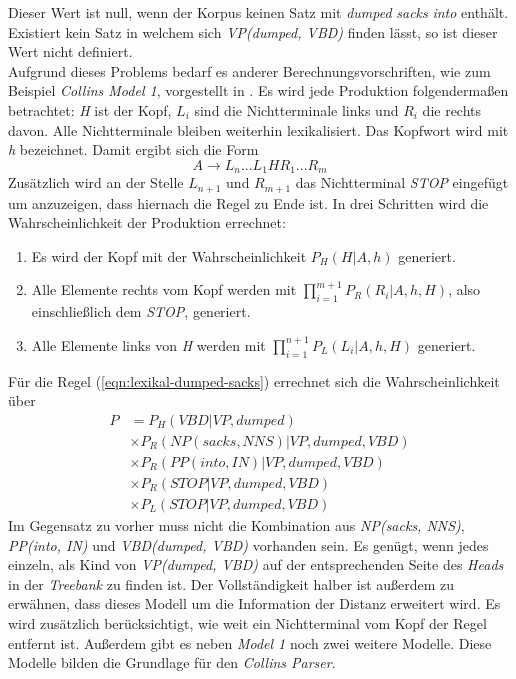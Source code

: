 Dieser Wert ist null, wenn der Korpus keinen Satz mit \textit{dumped} \textit{sacks} \textit{into} enthält. Existiert kein Satz in welchem sich \textit{VP(dumped, VBD)} finden lässt, so ist dieser Wert nicht definiert. \\
Aufgrund dieses Problems bedarf es anderer Berechnungsvorschriften, wie zum Beispiel \textit{Collins Model 1}, vorgestellt in \cite{collinsModel}. 
Es wird jede Produktion folgendermaßen betrachtet: \textit{H} ist der Kopf, \( L_i \) sind die Nichtterminale links und \( R_i \) die rechts davon. Alle Nichtterminale bleiben weiterhin lexikalisiert. Das Kopfwort wird mit \textit{h} bezeichnet. Damit ergibt sich die Form
\[ A \to L_n...L_1 H R_1...R_m \]
Zusätzlich wird an der Stelle \( L_{n+1} \) und \( R_{m+1} \) das Nichtterminal \textit{STOP} eingefügt um anzuzeigen, dass hiernach die Regel zu Ende ist. In drei Schritten wird die Wahrscheinlichkeit der Produktion errechnet:
\begin{enumerate}
\item Es wird der Kopf mit der Wahrscheinlichkeit \( P_H(H | A, h) \) generiert.
\item Alle Elemente rechts vom Kopf werden mit \( \displaystyle\prod_{i = 1}^{m+1} P_R(R_i | A, h, H) \), also einschließlich dem \textit{STOP}, generiert.
\item Alle Elemente links von \textit{H} werden mit \( \displaystyle\prod_{i = 1}^{n+1} P_L(L_i | A, h, H) \) generiert.
\end{enumerate}
Für die Regel (\ref{eqn:lexikal-dumped-sacks}) errechnet sich die Wahrscheinlichkeit über
\begin{align}
P & = P_H(VBD|VP, dumped) \nonumber \\ & \times P_R(NP(sacks, NNS)|VP, dumped, VBD) \nonumber \\ & \times P_R(PP(into, IN)|VP, dumped, VBD) \nonumber \\ & \times P_R(STOP|VP, dumped, VBD) \nonumber \\ & \times P_L(STOP|VP, dumped, VBD)
\end{align}
Im Gegensatz zu vorher muss nicht die Kombination aus \textit{NP(sacks, NNS)}, \textit{PP(into, IN)} und \textit{VBD(dumped, VBD)} vorhanden sein. Es genügt, wenn jedes einzeln, als Kind von \textit{VP(dumped, VBD)} auf der entsprechenden Seite des \textit{Heads} in der \textit{Treebank} zu finden ist. %
Der Vollständigkeit halber ist außerdem zu erwähnen, dass dieses Modell um die Information der Distanz erweitert wird. Es wird zusätzlich berücksichtigt, wie weit ein Nichtterminal vom Kopf der Regel entfernt ist. 
Außerdem gibt es neben \textit{Model 1} noch zwei weitere Modelle. Diese Modelle bilden die Grundlage für den \textit{Collins Parser}. \cite{collinsModel}